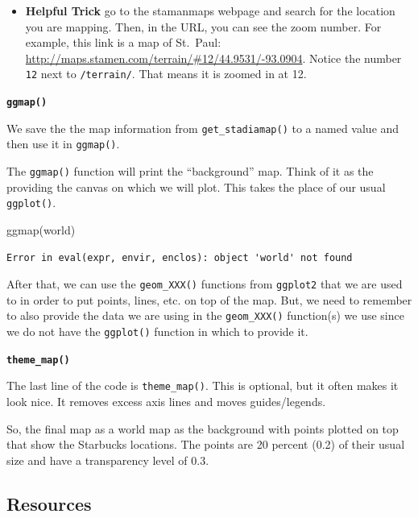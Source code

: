 \documentclass[
  letterpaper,
  DIV=11,
  numbers=noendperiod]{scrreprt}
\newenvironment{Shaded}{\begin{snugshade}}{\end{snugshade}}
\newcommand{\FunctionTok}[1]{\textcolor[rgb]{0.28,0.35,0.67}{#1}}
\newcommand{\NormalTok}[1]{\textcolor[rgb]{0.00,0.23,0.31}{#1}}
\providecommand{\tightlist}{%
  \setlength{\itemsep}{0pt}\setlength{\parskip}{0pt}}\usepackage{longtable,booktabs,array}
\begin{document}
\begin{itemize}
\tightlist
\item
  \textbf{Helpful Trick} go to the stamanmaps webpage and search for the
  location you are mapping. Then, in the URL, you can see the zoom
  number. For example, this link is a map of St.~Paul:
  \url{http://maps.stamen.com/terrain/\#12/44.9531/-93.0904}. Notice the
  number \texttt{12} next to \texttt{/terrain/}. That means it is zoomed
  in at 12.
\end{itemize}

\textbf{\texttt{ggmap()}}

We save the the map information from \texttt{get\_stadiamap()} to a
named value and then use it in \texttt{ggmap()}.

The \texttt{ggmap()} function will print the ``background'' map. Think
of it as the providing the canvas on which we will plot. This takes the
place of our usual \texttt{ggplot()}.

\begin{Shaded}
\begin{Highlighting}[]
\FunctionTok{ggmap}\NormalTok{(world)}
\end{Highlighting}
\end{Shaded}

\begin{verbatim}
Error in eval(expr, envir, enclos): object 'world' not found
\end{verbatim}

After that, we can use the \texttt{geom\_XXX()} functions from
\texttt{ggplot2} that we are used to in order to put points, lines, etc.
on top of the map. But, we need to remember to also provide the data we
are using in the \texttt{geom\_XXX()} function(s) we use since we do not
have the \texttt{ggplot()} function in which to provide it.

\textbf{\texttt{theme\_map()}}

The last line of the code is \texttt{theme\_map()}. This is optional,
but it often makes it look nice. It removes excess axis lines and moves
guides/legends.

So, the final map as a world map as the background with points plotted
on top that show the Starbucks locations. The points are 20 percent
(0.2) of their usual size and have a transparency level of 0.3.

\subsection*{Resources}\label{resources}
\end{document}

